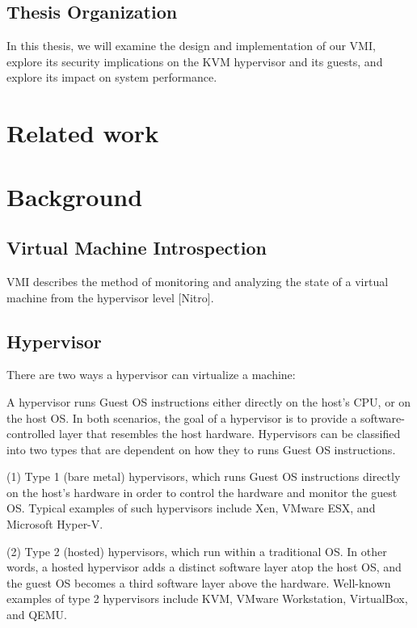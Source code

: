 \documentclass{report}
\begin{document}
\begin{spacing}{1.5}
\section{Thesis Organization}

In this thesis, we will examine the design and implementation of our VMI, explore its security implications on the KVM hypervisor and its guests, and explore its impact on system performance.




\chapter{Related work}



\chapter{Background}






\section{Virtual Machine Introspection}

VMI describes the method of monitoring and analyzing the state of a virtual machine from the hypervisor level [Nitro]. 


\section{Hypervisor}

{\large
There are two ways a hypervisor can virtualize a machine:

A hypervisor runs Guest OS instructions either directly on the host's CPU, or on the host OS. In both scenarios, 
the goal of a hypervisor is to provide a software-controlled layer that resembles the host hardware. Hypervisors 
can be classified into two types that are dependent on how they to runs Guest OS instructions.
\newline
}

{\large 
(1) Type 1 (bare metal) hypervisors, which runs Guest OS instructions directly on the host’s hardware in order to control
the hardware and monitor the guest OS. Typical examples of such hypervisors include Xen, VMware ESX, and Microsoft Hyper-V.
\newline
}

{\large
(2) Type 2 (hosted) hypervisors, which run within a traditional OS. In other words, a
hosted hypervisor adds a distinct software layer atop the host OS, and the guest OS becomes a third
software layer above the hardware. Well-known examples of type 2 hypervisors include KVM, 
VMware Workstation, VirtualBox, and QEMU.
\newline
}


\end{spacing}
\end{document}

